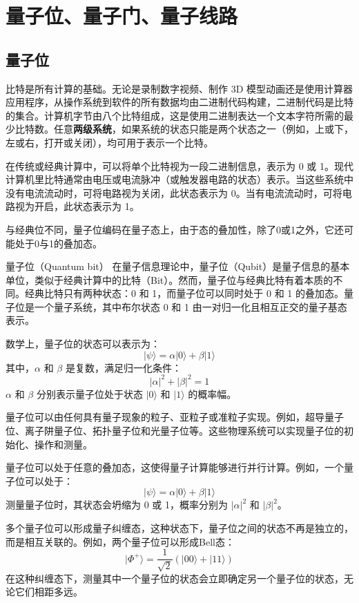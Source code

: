 \section{量子位、量子门、量子线路}
\subsection{量子位}
比特是所有计算的基础。无论是录制数字视频、制作 3D 模型动画还是使用计算器应用程序，从操作系统到软件的所有数据均由二进制代码构建，二进制代码是比特的集合。计算机字节由八个比特组成，这是使用二进制表达一个文本字符所需的最少比特数。任意\textbf{两级系统}，如果系统的状态只能是两个状态之一（例如，上或下，左或右，打开或关闭），均可用于表示一个比特。

在传统或经典计算中，可以将单个比特视为一段二进制信息，表示为 0 或 1。现代计算机里比特通常由电压或电流脉冲（或触发器电路的状态）表示。当这些系统中没有电流流动时，可将电路视为关闭，此状态表示为 0。当有电流流动时，可将电路视为开启，此状态表示为 1。

与经典位不同，量子位编码在量子态上，由于态的叠加性，除了0或1之外，它还可能处于0与1的叠加态。

\begin{define}{量子位（Quantum bit）}
在量子信息理论中，量子位（Qubit）是量子信息的基本单位，类似于经典计算中的比特（Bit）。然而，量子位与经典比特有着本质的不同。经典比特只有两种状态：0 和 1，而量子位可以同时处于 0 和 1 的叠加态。量子位是一个量子系统，其中布尔状态 0 和 1 由一对归一化且相互正交的量子基态表示。

 数学上，量子位的状态可以表示为：
     \[
     |\psi\rangle = \alpha |0\rangle + \beta |1\rangle
     \]
其中，\(\alpha\) 和 \(\beta\) 是复数，满足归一化条件：
     \[
     |\alpha|^2 + |\beta|^2 = 1
     \]
\(\alpha\) 和 \(\beta\) 分别表示量子位处于状态 \(|0\rangle\) 和 \(|1\rangle\) 的概率幅。
\end{define}
量子位可以由任何具有量子现象的粒子、亚粒子或准粒子实现。例如，超导量子位、离子阱量子位、拓扑量子位和光量子位等。这些物理系统可以实现量子位的初始化、操作和测量。

量子位可以处于任意的叠加态，这使得量子计算能够进行并行计算。例如，一个量子位可以处于：
     \[
     |\psi\rangle = \alpha|0\rangle + \beta |1\rangle
     \]
测量量子位时，其状态会坍缩为 0 或 1，概率分别为 \(|\alpha|^2\) 和 \(|\beta|^2\)。

 多个量子位可以形成量子纠缠态，这种状态下，量子位之间的状态不再是独立的，而是相互关联的。例如，两个量子位可以形成Bell态：
     \[
     |\Phi^+\rangle = \frac{1}{\sqrt{2}} (|00\rangle + |11\rangle)
     \]
在这种纠缠态下，测量其中一个量子位的状态会立即确定另一个量子位的状态，无论它们相距多远。

